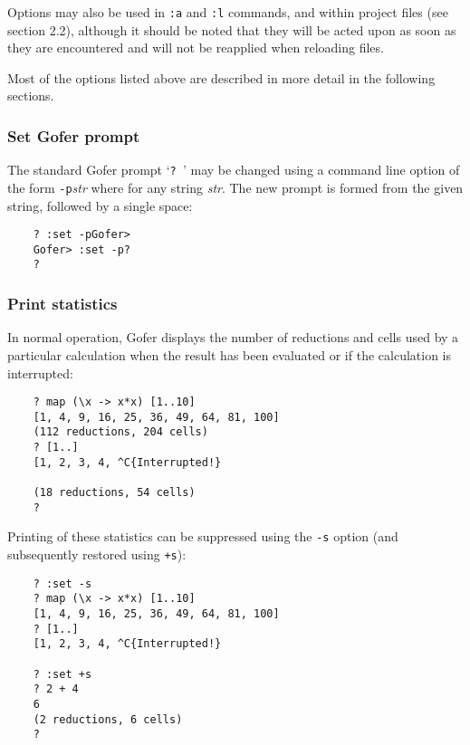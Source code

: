 Options may also be used in \verb":a" and \verb":l" commands, 
and within project files
(see section 2.2), although it should be noted that they will be acted
upon as soon as they are encountered and will not be reapplied when
reloading files.

Most of the options listed above are described in more detail in the
following sections.


\subsubsection{Set Gofer prompt}
The standard Gofer prompt `\verb"? "' may be changed using a command line
option of the form \verb"-p"{\em str} where for any string {\em str}.  
The new prompt is
formed from the given string, followed by a single space:
\begin{verbatim}
    ? :set -pGofer>
    Gofer> :set -p?
    ?
\end{verbatim}

\subsubsection{Print statistics}
In normal operation, Gofer displays the number of reductions and cells
used by a particular calculation when the result has been evaluated or
if the calculation is interrupted:
\begin{verbatim}
    ? map (\x -> x*x) [1..10]
    [1, 4, 9, 16, 25, 36, 49, 64, 81, 100]
    (112 reductions, 204 cells)
    ? [1..]
    [1, 2, 3, 4, ^C{Interrupted!}

    (18 reductions, 54 cells)
    ?
\end{verbatim}
Printing of these statistics can be suppressed using the \verb"-s" option
(and subsequently restored using \verb"+s"):
\begin{verbatim}
    ? :set -s
    ? map (\x -> x*x) [1..10]
    [1, 4, 9, 16, 25, 36, 49, 64, 81, 100]
    ? [1..]
    [1, 2, 3, 4, ^C{Interrupted!}

    ? :set +s
    ? 2 + 4
    6
    (2 reductions, 6 cells)
    ?
\end{verbatim}

